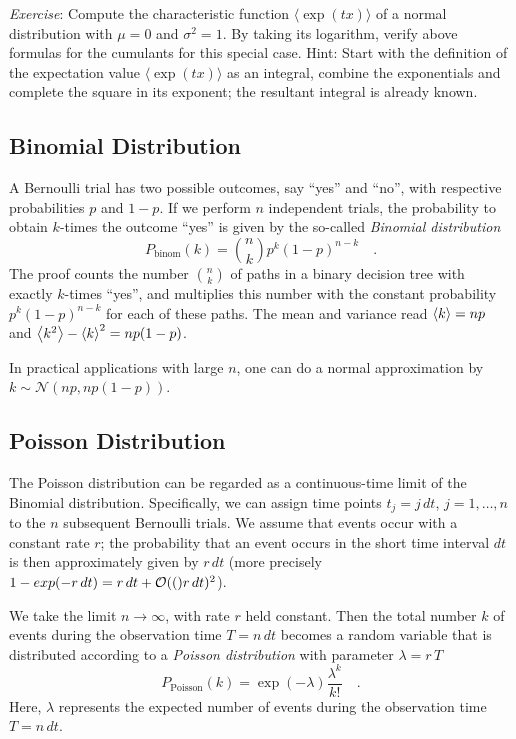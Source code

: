 \documentclass{notebook}
\newcommand{\Exercise}{\textit{Exercise}}
\begin{document}
\Exercise: Compute the characteristic function 
$\langle \exp(tx) \rangle$
of a normal distribution with $\mu=0$ and $\sigma^2=1$.
By taking its logarithm, verify above formulas for the cumulants for this special case.
Hint: 
Start with the definition of the expectation value $\langle \exp(tx) \rangle$ as an integral,
combine the exponentials and complete the square in its exponent;
the resultant integral is already known.

\subsection*{Binomial Distribution}
A Bernoulli trial has two possible outcomes, say ``yes'' and ``no'', with respective probabilities $p$ and $1 - p$. 
If we perform $n$ independent trials, the probability to obtain $k$-times the outcome ``yes'' is given by
the so-called \textit{Binomial distribution}
\begin{equation}
P_\mathrm{binom}(k) = \binom{n}{k} p^k (1 - p)^{n - k} \quad.
\end{equation}
The proof counts the number $\binom{n}{k}$ of paths in a binary decision tree with exactly $k$-times ``yes'', 
and multiplies this number with the constant probability $p^k(1-p)^{n-k}$ for each of these paths.
The mean and variance read $\expval{k} = n p$ and $\expval{k^2} - \expval{k}^2 = n p (1 - p)$. 

In practical applications with large $n$, one can do a normal approximation by 
$k \sim \mathcal{N}(np, n p (1 - p))$. %


\subsection*{Poisson Distribution}
The Poisson distribution can be regarded as a continuous-time limit of the Binomial distribution.
Specifically, 
we can assign time points $t_j = j \, dt$, $j=1,\ldots,n$ to the $n$ subsequent Bernoulli trials.
We assume that events occur with a constant rate $r$; 
the probability that an event occurs in the short time interval $dt$ 
is then approximately given by $r\,dt$
(more precisely $1-exp(-r\,dt)=r\,dt+\mathcal{O}(()r\,dt)^2$).

We take the limit $n\rightarrow\infty$, with rate $r$ held constant.
Then the total number $k$ of events during the observation time $T=n\,dt$ 
becomes a random variable that is distributed according to a
\textit{Poisson distribution} with parameter $\lambda = r\,T$
\begin{equation}
\label{eq:Ppoiss}
P_\mathrm{Poisson}(k) = \exp(-\lambda) \frac{\lambda^k}{k!} \quad.
\end{equation}
Here, $\lambda$ represents the expected number of events during the observation time $T=n\,dt$.
\end{document}

